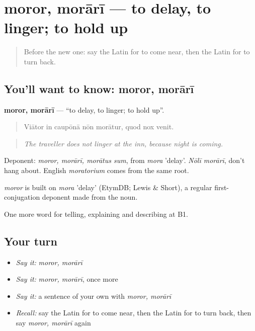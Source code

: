 \section[moror, morārī]{moror, morārī — to delay, to linger; to hold up}

\label{lesson:LA-C455-moror}



\begin{quote}
Before the new one: say the Latin for to come near, then the Latin for to turn back.
\end{quote}

\subsection*{You'll want to know: moror, morārī}
\textbf{moror, morārī} — \textquotedblleft{}to delay, to linger; to hold up\textquotedblright{}.

\begin{quote}
Viātor in caupōnā nōn morātur, quod nox venit.
\end{quote}

\begin{quote}
\emph{The traveller does not linger at the inn, because night is coming.}
\end{quote}

Deponent: \emph{moror, morārī, morātus sum}, from \emph{mora} 'delay'. \emph{Nōlī morārī}, don't hang about. English \emph{moratorium} comes from the same root.

\begin{cousinweb}
\emph{moror} is built on \emph{mora} 'delay' (EtymDB; Lewis \& Short), a regular first-conjugation deponent made from the noun.
\end{cousinweb}

\begin{grammarlens}[title={What you've built}]
One more word for telling, explaining and describing at B1.
\end{grammarlens}

\subsection*{Your turn}
\begin{itemize}
\raggedright
  \item \emph{Say it:} \emph{moror, morārī}
  \item \emph{Say it:} \emph{moror, morārī}, once more
  \item \emph{Say it:} a sentence of your own with \emph{moror, morārī}
  \item \emph{Recall:} say the Latin for to come near, then the Latin for to turn back, then say \emph{moror, morārī} again
\end{itemize}

